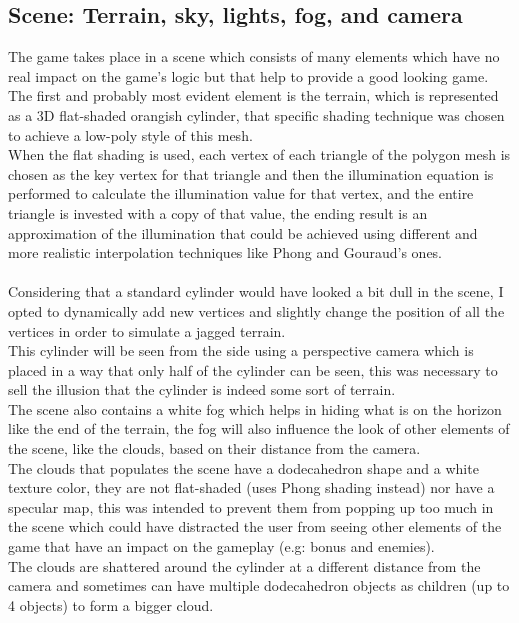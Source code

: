 \documentclass[a4paper,11pt]{article}
\begin{document}
\subsection{Scene: Terrain, sky, lights, fog, and camera}
The game takes place in a scene which consists of many elements which have no real impact on the game's logic but that help to provide a good looking game.\\
The first and probably most evident element is the terrain, which is represented as a 3D flat-shaded orangish cylinder, that specific shading technique was chosen to achieve a low-poly style of this mesh.\\
When the flat shading is used, each vertex of each triangle of the polygon mesh is chosen as the key vertex for that triangle and then the illumination equation is performed to calculate the illumination value for that vertex, and the entire triangle is invested with a copy of that value, the ending result is an approximation of the illumination that could be achieved using different and more realistic interpolation techniques like Phong and Gouraud's ones.\\\\ Considering that a standard cylinder would have looked a bit dull in the scene, I opted to dynamically add new vertices and slightly change the position of all the vertices in order to simulate a jagged terrain.\\
This cylinder will be seen from the side using a perspective camera which is placed in a way that only half of the cylinder can be seen, this was necessary to sell the illusion that the cylinder is indeed some sort of terrain.\\
The scene also contains a white fog which helps in hiding what is on the horizon like the end of the terrain, the fog will also influence the look of other elements of the scene, like the clouds, based on their distance from the camera.\\
The clouds that populates the scene have a dodecahedron shape and a white texture color, they are not flat-shaded (uses Phong shading instead) nor have a specular map, this was intended to prevent them from popping up too much in the scene which could have distracted the user from seeing other elements of the game that have an impact on the gameplay (e.g: bonus and enemies).\\
The clouds are shattered around the cylinder at a different distance from the camera and sometimes can have multiple dodecahedron objects as children (up to 4 objects) to form a bigger cloud.\\
\end{document}
